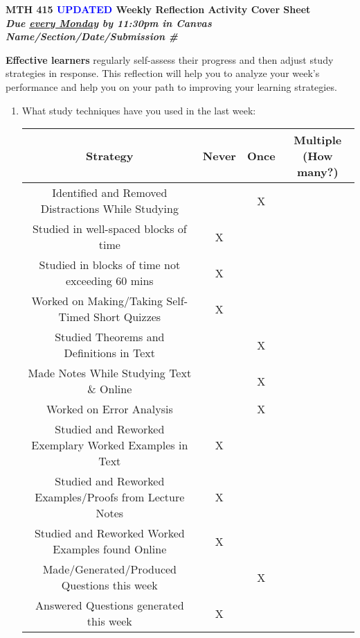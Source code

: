 \documentclass[10pt]{article}
\begin{document}
\begin{center}
\Large \bfseries MTH 415 \textcolor{blue}{UPDATED} Weekly Reflection Activity Cover Sheet\\ 
{\it Due \underline{every Monday} by 11:30pm in Canvas}\\ 
\smallskip
\it Name/Section/Date/Submission \# 
\end{center}

{\bf Effective learners} regularly self-assess their progress and then adjust study strategies in response. This reflection will help you to analyze your week's performance and help you on your path to improving your learning strategies.

\begin{enumerate}

\item What study techniques have you used in the last week:\\
	
	\begin{tabular}{|c|c|c|c|}
		\hline
		 {\bf Strategy} & {\bf Never} & {\bf Once} & {\bf Multiple (How many?)}\\
		\hline
		Identified and Removed Distractions While Studying &&X&\\
		\hline
		Studied in well-spaced blocks of time &X&&\\
		\hline
		Studied in blocks of time not exceeding 60 mins &X&&\\
		\hline
		Worked on Making/Taking Self-Timed Short Quizzes &X&&\\
		\hline
		\hline


		Studied Theorems and Definitions in Text&&X&\\
		\hline 
		Made Notes While Studying Text \& Online&&X&\\
		\hline 
		Worked on Error Analysis&&X&\\
		\hline 
		\hline
		 
		Studied and Reworked Exemplary Worked Examples in Text &X&&\\
		\hline 
		Studied and Reworked Examples/Proofs from Lecture Notes &X&&\\
		\hline 
		Studied and Reworked Worked Examples found Online &X&&\\
		\hline 
		\hline


		Made/Generated/Produced Questions this week &&X&\\
		\hline
		Answered Questions generated this week &X&&\\
		\hline
		\hline
		

\end{tabular}
\end{enumerate}
\end{document}
